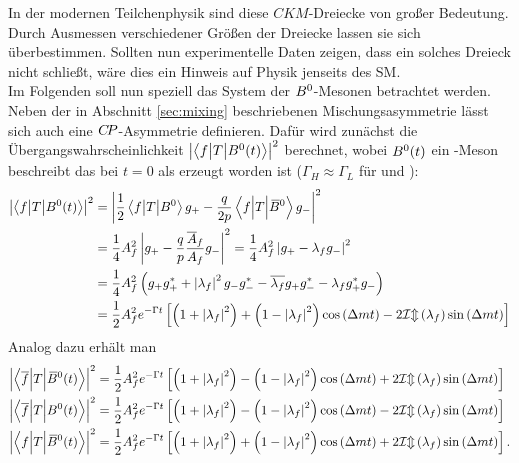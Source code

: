 In der modernen Teilchenphysik sind diese $C\!K\!M$-Dreiecke von großer Bedeutung. Durch Ausmessen verschiedener Größen der Dreiecke lassen sie sich überbestimmen. Sollten nun experimentelle Daten zeigen, dass ein solches Dreieck nicht schließt, wäre dies ein Hinweis auf Physik jenseits des SM.\\
Im Folgenden soll nun speziell das System der ${{B}^0}$-Mesonen betrachtet werden. Neben der in Abschnitt \ref{sec:mixing} beschriebenen Mischungsasymmetrie lässt sich auch eine ${C\!P}$-Asymmetrie definieren. Dafür wird zunächst die Übergangswahrscheinlichkeit $\left|\left<f\big|T\big|{{B}^0}(t)\right>\right|^2$ berechnet, wobei ${{B}^0}(t)$ ein \B-Meson beschreibt das bei $t=0$ als \Bz erzeugt worden ist ($\Gamma_H\approx\Gamma_L$ für \Bz und \Bzb):
\begin{align}
\left|\left<f\big|T\big|{{B}^0}(t)\right>\right|^2&=\left|\frac{1}{2}\left<f\big|T\big|{{B}^0}\right>g_+-\frac{q}{2p}\left<f\Big|T\Big|{{\kern 0.18em\overline{\kern -0.18em B}{}}{}^0}\right>g_-\right|^2\nonumber\\
&=\frac{1}{4}A_f^2\left|g_+-\frac{q}{p}\frac{\overline{A}_f}{A_f}g_-\right|^2=\frac{1}{4}A_f^2\left|g_+-\lambda_fg_-\right|^2\nonumber\\
&=\frac{1}{4}A_f^2\left(g_+g_+^*+\left|\lambda_f\right|^2g_-g_-^*-\overline{\lambda_f}g_+g_-^*-\lambda_f g_+^*g_-\right)\nonumber\\
&=\frac{1}{2}A_f^2e^{-\Gamma t}\left[\left(1+\left|\lambda_f\right|^2\right)+\left(1-\left|\lambda_f\right|^2\right)\cos\left({\Delta m} t\right)-2\mathcal{Im}\left(\lambda_f\right)\sin\left({\Delta m} t\right)\right]
\end{align}
Analog dazu erhält man
\begin{align}
\left|\left<\overline{f}\Big|T\Big|{{\kern 0.18em\overline{\kern -0.18em B}{}}{}^0}(t)\right>\right|^2&=\frac{1}{2}A_f^2e^{-\Gamma t}\left[\left(1+\left|\lambda_f\right|^2\right)-\left(1-\left|\lambda_f\right|^2\right)\cos\left({\Delta m} t\right)+2\mathcal{Im}\left(\lambda_f\right)\sin\left({\Delta m} t\right)\right]\\
\left|\left<\overline{f}\Big|T\Big|{{B}^0}(t)\right>\right|^2&=\frac{1}{2}A_f^2e^{-\Gamma t}\left[\left(1+\left|\lambda_f\right|^2\right)-\left(1-\left|\lambda_f\right|^2\right)\cos\left({\Delta m} t\right)-2\mathcal{Im}\left(\lambda_f\right)\sin\left({\Delta m} t\right)\right]\\
\left|\left<f\Big|T\Big|{{\kern 0.18em\overline{\kern -0.18em B}{}}{}^0}(t)\right>\right|^2&=\frac{1}{2}A_f^2e^{-\Gamma t}\left[\left(1+\left|\lambda_f\right|^2\right)+\left(1-\left|\lambda_f\right|^2\right)\cos\left({\Delta m} t\right)+2\mathcal{Im}\left(\lambda_f\right)\sin\left({\Delta m} t\right)\right].
\end{align}

